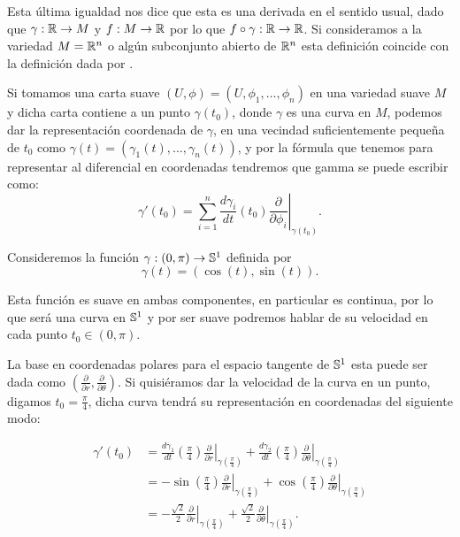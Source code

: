Esta última igualdad nos dice que esta es una derivada en el sentido usual, dado que $\gamma: \R \to M$ y $f: M \to \R$ por lo que $f \circ \gamma: \R \to \R$. Si consideramos a la variedad $M=\R^n$ o algún subconjunto abierto de $\R^n$ esta definición coincide con la definición dada por \textcite{do2016differential}.

Si tomamos una carta suave $(U,\phi) = (U,\phi_1,\dots,\phi_n)$ en una variedad suave $M$ y dicha carta contiene a un punto $\gamma(t_0)$, donde $\gamma$ es una curva en $M$, podemos dar la representación coordenada de $\gamma$, en una vecindad suficientemente pequeña de $t_0$ como $\gamma(t) = (\gamma_1(t), \dots, \gamma_n(t))$, y por la fórmula que tenemos para representar al diferencial en coordenadas tendremos que gamma se puede escribir como:
\[
	\gamma'(t_0)=\sum_{i=1}^{n}\frac{d \gamma_i}{dt} (t_0)
	\left. \frac{\partial}{\partial \phi_i} \right|_{\gamma(t_0)}.
\]

\begin{example}
	Consideremos la función $\gamma: (0,\pi) \to \S^{1}$ definida por
	\[
		\gamma(t) = (\cos (t), \sin (t)).
	\]

	Esta función es suave en ambas componentes, en particular es continua, por lo que será una curva en $\S^1$ y por ser suave podremos hablar de su velocidad en cada punto $t_0 \in (0,\pi)$.

	La base en coordenadas polares para el espacio tangente de $\S^{1}$ esta puede ser dada como $\left( \frac{\partial}{\partial r} , \frac{\partial}{\partial \theta} \right)$. Si quisiéramos dar la velocidad de la curva en un punto, digamos $t_0 = \frac{\pi}{4}$, dicha curva tendrá su representación en coordenadas del siguiente modo:

	\begin{align*}
		\gamma'(t_0) & = \frac{d \gamma_1}{dt}\left( \frac{\pi}{4} \right)
		\left.\frac{\partial}{\partial r} \right|_{\gamma(\frac{\pi}{4})} +
		\frac{d \gamma_2}{dt} \left(\frac{\pi}{4} \right)
		\left.\frac{\partial}{\partial\theta} \right|_{\gamma(\frac{\pi}{4})} \\
		             & = -\sin \left(\frac{\pi}{4}\right)
		\left. \frac{\partial}{\partial r} \right|_{\gamma(\frac{\pi}{4})} +
		\cos \left( \frac{\pi}{4} \right)
		\left.\frac{\partial}{\partial\theta}\right|_{\gamma(\frac{\pi}{4})}  \\
		             & = -\frac{\sqrt{2}}{2}
		\left. \frac{\partial}{\partial r} \right|_{\gamma(\frac{\pi}{4})}
		+ \frac{\sqrt{2}}{2}
		\left. \frac{\partial}{\partial\theta} \right|_{\gamma(\frac{\pi}{4})}.
	\end{align*}
\end{example}


